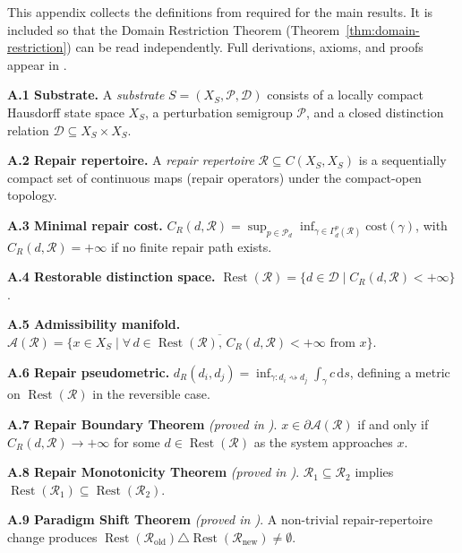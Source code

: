 \documentclass[12pt, oneside]{article}
\theoremstyle{plain}
\theoremstyle{definition}
\theoremstyle{remark}
\DeclareMathOperator{\Rest}{Rest}
\newcommand{\CR}{C_{\!R}}
\newcommand{\AO}{\mathcal{A}}
\newcommand{\Dsub}{\mathcal{D}}
\newcommand{\Xsub}{X_S}
\newcommand{\RestR}{\Rest(\mathcal{R})}
\newcommand{\bA}{\partial\mathcal{A}}
\begin{document}
This appendix collects the definitions from \cite{Flyxion2026a}
required for the main results.
It is included so that the Domain Restriction Theorem
(Theorem~\ref{thm:domain-restriction}) can be read independently.
Full derivations, axioms, and proofs appear in \cite{Flyxion2026a}.

\medskip\noindent
\textbf{A.1 Substrate.}\;
A \emph{substrate} $S = (\Xsub, \mathcal{P}, \Dsub)$ consists of
a locally compact Hausdorff state space $\Xsub$, a perturbation
semigroup $\mathcal{P}$, and a closed distinction relation
$\Dsub \subseteq \Xsub \times \Xsub$.

\medskip\noindent
\textbf{A.2 Repair repertoire.}\;
A \emph{repair repertoire} $\mathcal{R} \subseteq C(\Xsub, \Xsub)$
is a sequentially compact set of continuous maps (repair operators)
under the compact-open topology.

\medskip\noindent
\textbf{A.3 Minimal repair cost.}\;
$\CR(d, \mathcal{R}) = \sup_{p \in \mathcal{P}_d}
\inf_{\gamma \in \Gamma_d^p(\mathcal{R})} \mathrm{cost}(\gamma)$,
with $\CR(d, \mathcal{R}) = +\infty$ if no finite repair path
exists.

\medskip\noindent
\textbf{A.4 Restorable distinction space.}\;
$\RestR = \{d \in \Dsub \mid \CR(d, \mathcal{R}) < +\infty\}$.

\medskip\noindent
\textbf{A.5 Admissibility manifold.}\;
$\AO(\mathcal{R}) = \overline{\{x \in \Xsub \mid \forall\,
d \in \RestR,\, \CR(d,\mathcal{R}) < +\infty \text{ from } x\}}$.

\medskip\noindent
\textbf{A.6 Repair pseudometric.}\;
$d_R(d_i, d_j) = \inf_{\gamma: d_i \rightsquigarrow d_j}
\int_\gamma c\, \mathrm{d}s$, defining a metric on $\RestR$ in
the reversible case.

\medskip\noindent
\textbf{A.7 Repair Boundary Theorem} \emph{(proved in \cite{Flyxion2026a})}.
$x \in \bA(\mathcal{R})$ if and only if
$\CR(d, \mathcal{R}) \to +\infty$ for some $d \in \RestR$
as the system approaches $x$.

\medskip\noindent
\textbf{A.8 Repair Monotonicity Theorem}
\emph{(proved in \cite{Flyxion2026a})}.
$\mathcal{R}_1 \subseteq \mathcal{R}_2$ implies
$\Rest(\mathcal{R}_1) \subseteq \Rest(\mathcal{R}_2)$.

\medskip\noindent
\textbf{A.9 Paradigm Shift Theorem}
\emph{(proved in \cite{Flyxion2026a})}.
A non-trivial repair-repertoire change produces
$\Rest(\mathcal{R}_{\text{old}}) \triangle
\Rest(\mathcal{R}_{\text{new}}) \neq \emptyset$.


\end{document}
